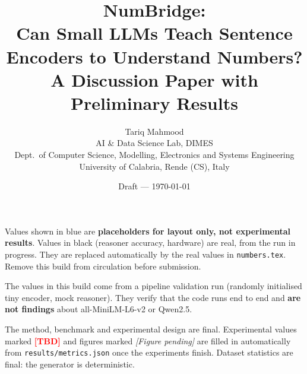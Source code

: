 \documentclass[11pt]{article}
\title{\textbf{NumBridge:\\Can Small LLMs Teach Sentence Encoders to Understand Numbers?}\\[4pt]
\large A Discussion Paper with Preliminary Results}
\author{Tariq Mahmood\\
\small AI \& Data Science Lab, DIMES\\Dept.\ of Computer Science, Modelling, Electronics and Systems Engineering\\
University of Calabria, Rende (CS), Italy}
\date{Draft --- \today}
\newcommand{\dummyval}[1]{\textcolor{blue!70!black}{#1}}%
\newcommand{\tbd}{\textcolor{red}{\textbf{[TBD]}}}
\begin{document}
\maketitle

\ifdefined\ResultsAreDummy
\begin{tcolorbox}[colback=orange!10,colframe=orange!80!black,title=Illustrative dummy values]
Values shown in \dummyval{blue} are \textbf{placeholders for layout only, not experimental results}. Values in
black (reasoner accuracy, hardware) are real, from the run in progress. They are replaced automatically by the real values in \texttt{numbers.tex}. Remove this
build from circulation before submission.
\end{tcolorbox}
\else\ifdefined\ResultsAreMock
\begin{tcolorbox}[colback=red!8,colframe=red!70!black,title=Pipeline-check numbers]
The values in this build come from a pipeline validation run (randomly initialised tiny encoder, mock reasoner).
They verify that the code runs end to end and \textbf{are not findings} about all-MiniLM-L6-v2 or Qwen2.5.
\end{tcolorbox}
\else\ifdefined\ResultsAvailable\else
\begin{tcolorbox}[colback=blue!5,colframe=blue!50!black,title=Status of this draft]
The method, benchmark and experimental design are final. Experimental values marked \tbd{} and figures marked
\emph{[Figure pending]} are filled in automatically from \texttt{results/metrics.json} once the experiments
finish. Dataset statistics are final: the generator is deterministic.
\end{tcolorbox}
\fi\fi\fi
\end{document}
